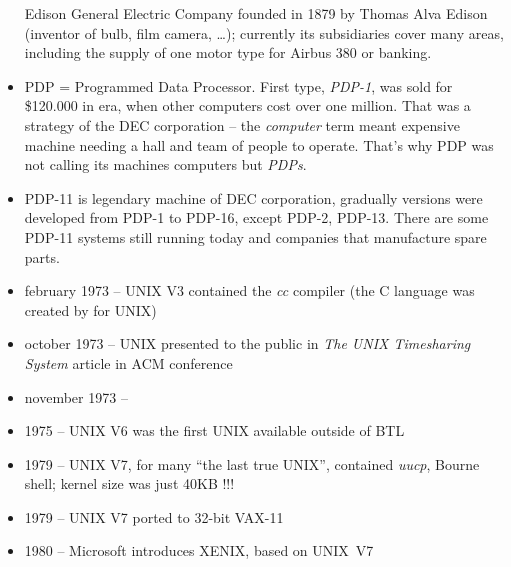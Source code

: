 \begin{itemize}
Edison General Electric Company founded in 1879 by Thomas Alva Edison
(inventor of bulb, film camera, \dots); currently its subsidiaries cover many
areas, including the supply of one motor type for Airbus 380 or banking.
\item PDP = Programmed Data Processor. First type, \emph{PDP-1}, was sold for
\$120.000 in era, when other computers cost over one million. That was a
strategy of the DEC corporation -- the \emph{computer} term meant expensive
machine needing a hall and team of people to operate. That's why PDP was not
calling its machines computers but \emph{PDPs}.
\item PDP-11 is legendary machine of DEC corporation, gradually versions were
developed from PDP-1 to PDP-16, except PDP-2, PDP-13. There are some PDP-11
systems still running today and companies that manufacture spare parts. 
\end{itemize}


\begin{slide}
\begin{itemize}
\item february 1973 -- UNIX V3 contained the \emph{cc} compiler (the C
language was created by  for UNIX)
\item october 1973 -- UNIX presented to the public in \emph{The
UNIX Timesharing System} article in ACM conference
\item november 1973 -- 
\item 1975 -- UNIX V6 was the first UNIX available outside of BTL
\item 1979 -- UNIX V7, for many ``the last true UNIX'', contained
\emph{uucp}, Bourne shell; kernel size was just 40KB !!!
\item 1979 -- UNIX V7 ported to 32-bit VAX-11
\item 1980 -- Microsoft introduces XENIX, based on UNIX~V7
\end{itemize}
\end{slide}

